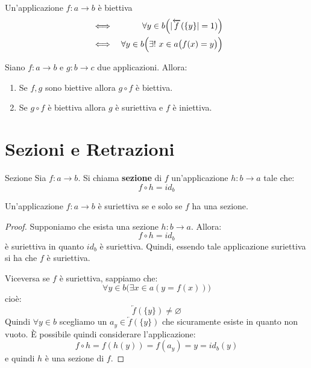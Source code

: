 \begin{propbox}
	Un'applicazione $f: a \longrightarrow b$ è biettiva
	\begin{eqnarray}
		&\iff& \forall y \in b \Bigl( |\overleftarrow{f}(\{y\}| = 1)  \Bigr)  \\
		&\iff& \forall y \in b \Bigl ( \exists! \  x \in a \bigl (f(x) = y \bigl) \Bigl)
	\end{eqnarray}
\end{propbox}

\begin{corolbox}
	Siano $f:a \longrightarrow b$ e $g: b \longrightarrow c$ due applicazioni. Allora:
	\begin{enumerate}
		\item Se $f,g$ sono biettive allora $g \circ f$ è biettiva.
		\item Se $g \circ f$ è biettiva allora $g$ è suriettiva e $f$ è iniettiva.
	\end{enumerate}
\end{corolbox}

\section{Sezioni e Retrazioni}
\begin{defbox}{Sezione}
	Sia $f:a \longrightarrow b$. Si chiama \textbf{sezione} di $f$ un'applicazione $h: b \longrightarrow a$ tale che:
	\begin{equation}
		f \circ h = id_{b}
	\end{equation}
\end{defbox}

\begin{teorbox}\label{thm:car_sezioni}
	Un'applicazione $f:a \longrightarrow b$ è suriettiva se e solo se $f$ ha una sezione.
\end{teorbox}

\begin{proof}
	Supponiamo che esista una sezione $h:b \longrightarrow a$. Allora:
	\begin{displaymath}
		f \circ h = id_{b}
	\end{displaymath}
	è suriettiva in quanto $id_{b}$ è suriettiva. Quindi, essendo tale applicazione suriettiva si ha che $f$ è suriettiva.
	
	Viceversa se $f$ è suriettiva, sappiamo che:
	\begin{displaymath}
		\forall y \in b \bigl(\exists x \in a (y=f(x))\bigr)
	\end{displaymath}
	cioè:
	\begin{displaymath}
		\overleftarrow{f}(\{y\}) \neq \varnothing
	\end{displaymath}
	Quindi $\forall y \in b$ scegliamo un $a_{y} \in 	\overleftarrow{f}(\{y\})$ che sicuramente esiste in quanto non vuoto. È possibile quindi considerare l'applicazione:
	\begin{displaymath}
		f \circ h = f(h(y)) = f(a_{y}) = y = id_{b}(y)
	\end{displaymath}
	e quindi $h$ è una sezione di $f$.
\end{proof}


